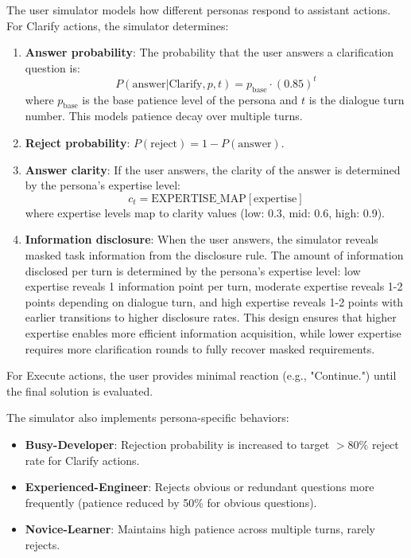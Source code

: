 The user simulator models how different personas respond to assistant actions. For Clarify actions, the simulator determines:

\begin{enumerate}
    \item \textbf{Answer probability}: The probability that the user answers a clarification question is:
    \begin{equation}
    P(\text{answer} | \text{Clarify}, p, t) = p_{\text{base}} \cdot (0.85)^t
    \end{equation}
    where $p_{\text{base}}$ is the base patience level of the persona and $t$ is the dialogue turn number. This models patience decay over multiple turns.
    
    \item \textbf{Reject probability}: $P(\text{reject}) = 1 - P(\text{answer})$.
    
    \item \textbf{Answer clarity}: If the user answers, the clarity of the answer is determined by the persona's expertise level:
    \begin{equation}
    c_t = \text{EXPERTISE\_MAP}[\text{expertise}]
    \end{equation}
    where expertise levels map to clarity values (low: 0.3, mid: 0.6, high: 0.9).
    
    \item \textbf{Information disclosure}: When the user answers, the simulator reveals masked task information from the disclosure rule. The amount of information disclosed per turn is determined by the persona's expertise level: low expertise reveals 1 information point per turn, moderate expertise reveals 1-2 points depending on dialogue turn, and high expertise reveals 1-2 points with earlier transitions to higher disclosure rates. This design ensures that higher expertise enables more efficient information acquisition, while lower expertise requires more clarification rounds to fully recover masked requirements.
\end{enumerate}

For Execute actions, the user provides minimal reaction (e.g., "Continue.") until the final solution is evaluated.

The simulator also implements persona-specific behaviors:
\begin{itemize}
    \item \textbf{Busy-Developer}: Rejection probability is increased to target $>80\%$ reject rate for Clarify actions.
    \item \textbf{Experienced-Engineer}: Rejects obvious or redundant questions more frequently (patience reduced by 50\% for obvious questions).
    \item \textbf{Novice-Learner}: Maintains high patience across multiple turns, rarely rejects.
\end{itemize}


